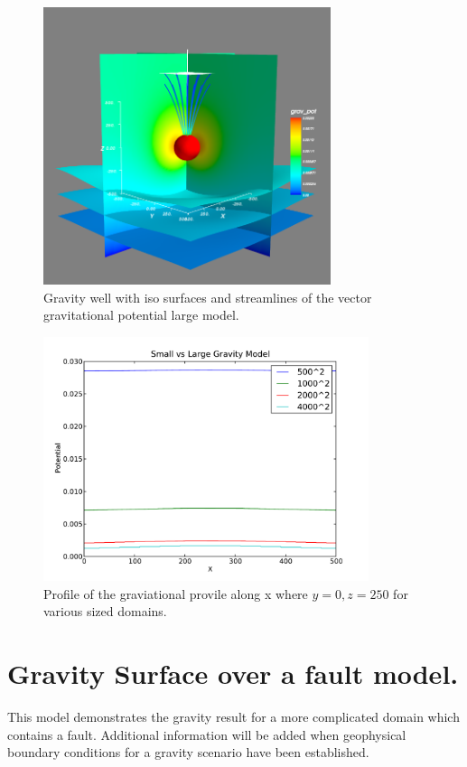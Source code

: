 \begin{figure}[htp]
\centering
\includegraphics[width=0.75\textwidth]{figures/ex10bpot2.png}
\caption{Gravity well with iso surfaces and streamlines of the vector
gravitational potential \textemdash large model.}
\label{fig:ex10bpot2}
\end{figure}

\begin{figure}[htp]
\centering
\includegraphics[width=0.85\textwidth]{figures/ex10p_boundeff.pdf}
\caption{Profile of the graviational provile along x where $y=0,z=250$ for
various sized domains.}
\label{fig:ex10p}
\end{figure}
\clearpage

\section{Gravity Surface over a fault model.}
This model demonstrates the gravity result for a more complicated domain which
contains a fault. Additional information will be added when geophysical boundary
conditions for a gravity scenario have been established.

